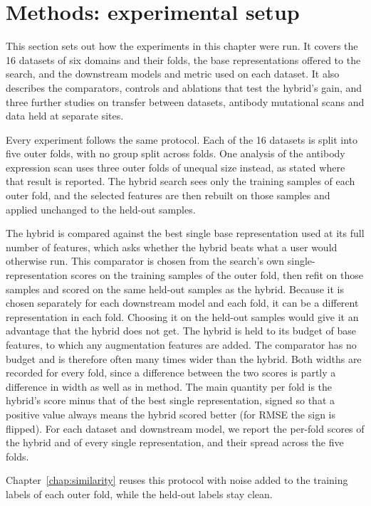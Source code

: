 \section{Methods: experimental setup}
This section sets out how the experiments in this chapter were run. It covers the 16 datasets of six domains and their folds, the base representations offered to the search, and the downstream models and metric used on each dataset. It also describes the comparators, controls and ablations that test the hybrid's gain, and three further studies on transfer between datasets, antibody mutational scans and data held at separate sites.

Every experiment follows the same protocol. Each of the 16 datasets is split into five outer folds, with no group split across folds. One analysis of the antibody expression scan uses three outer folds of unequal size instead, as stated where that result is reported. The hybrid search sees only the training samples of each outer fold, and the selected features are then rebuilt on those samples and applied unchanged to the held-out samples.

The hybrid is compared against the best single base representation used at its full number of features, which asks whether the hybrid beats what a user would otherwise run. This comparator is chosen from the search's own single-representation scores on the training samples of the outer fold, then refit on those samples and scored on the same held-out samples as the hybrid. Because it is chosen separately for each downstream model and each fold, it can be a different representation in each fold. Choosing it on the held-out samples would give it an advantage that the hybrid does not get. The hybrid is held to its budget of base features, to which any augmentation features are added. The comparator has no budget and is therefore often many times wider than the hybrid. Both widths are recorded for every fold, since a difference between the two scores is partly a difference in width as well as in method. The main quantity per fold is the hybrid's score minus that of the best single representation, signed so that a positive value always means the hybrid scored better (for RMSE the sign is flipped). For each dataset and downstream model, we report the per-fold scores of the hybrid and of every single representation, and their spread across the five folds.

Chapter~\ref{chap:similarity} reuses this protocol with noise added to the training labels of each outer fold, while the held-out labels stay clean.


